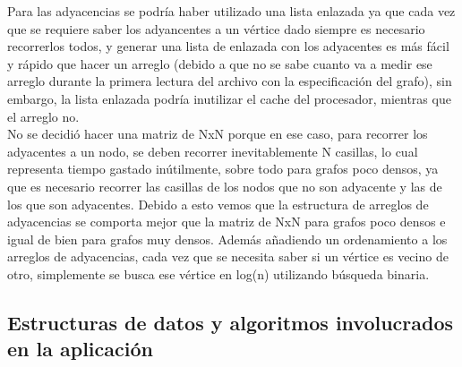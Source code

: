 \documentclass[a4paper,10pt]{article}
\begin{document}
  \indent Para las adyacencias se podr\'ia haber utilizado una lista enlazada ya
  que cada vez que se requiere saber los adyancentes a un vértice dado
  siempre es necesario recorrerlos todos, y generar una lista de
  enlazada con los adyacentes es m\'as f\'acil y r\'apido que hacer un
  arreglo (debido a que no se sabe cuanto va a medir
  ese arreglo durante la primera lectura del archivo con la
  especificaci\'on del grafo), sin embargo, la lista enlazada podr\'ia
  inutilizar el cache del procesador, mientras que el arreglo no.\\

  \indent No se decidi\'o hacer una matriz de NxN porque en ese caso, para recorrer los
  adyacentes a un nodo, se deben recorrer inevitablemente N casillas, lo
  cual representa tiempo gastado in\'utilmente, sobre todo para grafos
  poco densos, ya que es necesario recorrer las casillas de los nodos que
  no son adyacente y las de los que son adyacentes. Debido a esto vemos
  que la estructura de arreglos de adyacencias se comporta mejor que la
  matriz de NxN para grafos poco densos e igual de bien para grafos muy
  densos. Además añadiendo un ordenamiento a los arreglos de adyacencias, cada vez que 
se necesita saber si un vértice es vecino de otro, simplemente se busca ese vértice en log(n)
utilizando búsqueda binaria.

\subsection{Estructuras de datos y algoritmos involucrados en la aplicación}
\end{document}
